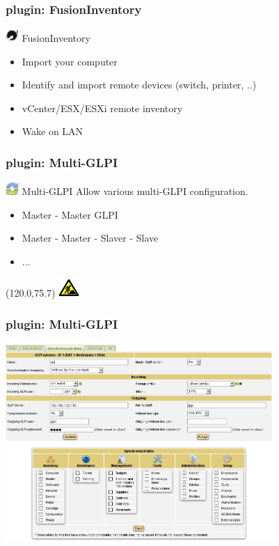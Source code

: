 \documentclass{beamer}
\newcommand{\WorkInProgress}{%
\begin{textblock}{14}(120.0,75.7)
\includegraphics[height=0.7cm]{./pics/workinprogress.jpg}
\end{textblock}
  }
\begin{document}
\begin{frame}
    \frametitle{plugin: FusionInventory}

    
    \begin{block}{\includegraphics[height=0.5cm]{./pics/plugins/fusioninventory.jpg} FusionInventory}
        \begin{itemize}
            \item Import your computer
            \item Identify and import remote devices (switch, printer, ..)
            \item vCenter/ESX/ESXi remote inventory
            \item Wake on LAN
        \end{itemize}
    \end{block}

\end{frame}


\begin{frame}
    \frametitle{plugin: Multi-GLPI}
    
    \begin{block}{\includegraphics[height=0.5cm]{./pics/plugins/multiglpi.jpg} Multi-GLPI}
        Allow various multi-GLPI configuration.
        \begin{itemize}
            \item Master - Master GLPI
            \item Master - Master - Slaver - Slave
            \item ...
        \end{itemize}
    \end{block}


\WorkInProgress
\end{frame}

\begin{frame}
    \frametitle{plugin: Multi-GLPI}

    \includegraphics[height=7.5cm]{./pics/multiglpi/multiGLPi.jpg}
    



\end{frame}
\end{document}
